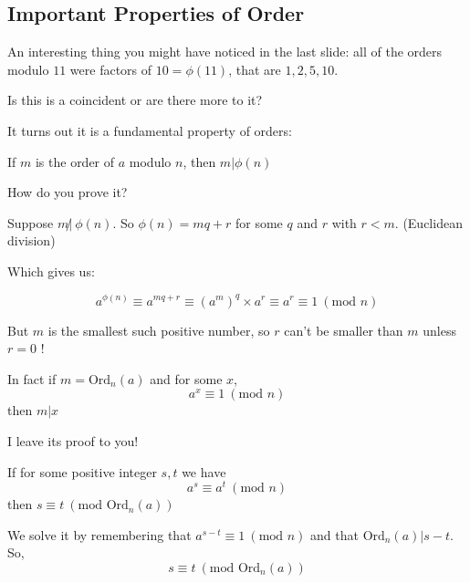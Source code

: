 \documentclass[compress]{beamer}
\newcommand{\gap}{\pause\vspace{1em}}
\begin{document}
\subsection{Important Properties of Order}

\begin{frame}
    An interesting thing you might have noticed in the last slide: all of the
    orders modulo $11$ were factors of $10 = \phi(11)$, that are $1, 2, 5,
    10$.

    \gap

    Is this is a coincident or are there more to it?
\end{frame}

\begin{frame}
    It turns out it is a fundamental property of orders:

    \gap

    \textcolor{NordRed}{If $m$ is the order of $a$ modulo $n$, then 
    $m | \phi(n)$}

    \gap

    How do you prove it? 

    \gap

    Suppose $m\not|\ \phi(n)$. So $\phi(n) = mq + r$ for
    some $q$ and $r$ with $r <m$. (Euclidean division)

    \gap

    Which gives us:

    \[a^{\phi(n)} \equiv a^{mq + r} \equiv {\left(a^m\right)}^q \times a^r \equiv a^r \equiv
    1 \ (\text{mod } n)\] 

    But $m$ is the smallest such positive number, so $r$ can't be smaller than $m$
    unless $r =0$ !
\end{frame}

\begin{frame}
    \textcolor{NordOrange}{
        In fact if $m = \text{Ord}_n(a)$ and for some $x$, 
        \[a^x \equiv 1 \ (\text{mod } n)\]
        then $m | x$
    }

    \vspace{1em}

    I leave its proof to you!
\end{frame}

\begin{frame}
    \textcolor{NordOrange}{If for some positive integer $s, t$ we have 
        \[a^s \equiv a^t \ (\text{mod } n)\] then $s \equiv t \ \left(\text{mod }
        \text{Ord}_n(a)\right)$ 
    }

    \gap

    We solve it by remembering that $a^{s-t} \equiv 1 \ (\text{mod } n)$ and
    that $\text{Ord}_n(a) | s-t$. So,
    \[s \equiv t \ (\text{mod } \text{Ord}_n(a))\] 

\end{frame}
\end{document}
